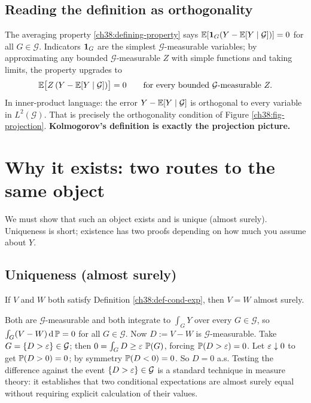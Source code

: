 \subsection{Reading the definition as orthogonality}
\label{ch38:read-as-orthogonality}

The averaging property \eqref{ch38:defining-property} says $\E[\ind_G (Y - \E[Y\given\mathcal{G}])] =
0$ for all $G \in \mathcal{G}$. Indicators $\ind_G$ are the simplest $\mathcal{G}$-measurable
variables; by approximating any bounded $\mathcal{G}$-measurable $Z$ with simple functions and taking
limits, the property upgrades to
\begin{equation}
\label{ch38:orthogonality}
  \E\!\big[Z\,(Y - \E[Y \given \mathcal{G}])\big] = 0 \qquad \text{for every bounded }
  \mathcal{G}\text{-measurable } Z.
\end{equation}
In inner-product language: the error $Y - \E[Y\given\mathcal{G}]$ is orthogonal to every variable in
$L^2(\mathcal{G})$. That is precisely the orthogonality condition of Figure
\ref{ch38:fig-projection}. \textbf{Kolmogorov's definition is exactly the projection picture.}

\section{Why it exists: two routes to the same object}
\label{ch38:existence}

We must show that such an object exists and is unique (almost surely). Uniqueness is short; existence has two proofs depending on how much you assume about $Y$.

\subsection{Uniqueness (almost surely)}
\label{ch38:uniqueness}

\begin{proposition}[Uniqueness]
\label{ch38:prop-uniqueness}
If $V$ and $W$ both satisfy Definition \ref{ch38:def-cond-exp}, then $V = W$ almost surely.
\end{proposition}

\begin{whybox}
Both are $\mathcal{G}$-measurable and both integrate to $\int_G Y$ over every $G \in \mathcal{G}$, so
$\int_G (V - W)\,\dd\P = 0$ for all $G \in \mathcal{G}$. Now $D := V - W$ is $\mathcal{G}$-measurable.
Take $G = \set{D > \eps} \in \mathcal{G}$; then $0 = \int_G D \ge \eps\,\P(G)$, forcing
$\P(D > \eps) = 0$. Let $\eps \downarrow 0$ to get $\P(D > 0) = 0$; by symmetry $\P(D < 0) = 0$. So
$D = 0$ a.s. Testing the difference against the event $\set{D > \eps} \in \mathcal{G}$
is a standard technique in measure theory: it establishes that two conditional expectations
are almost surely equal without requiring explicit calculation of their values.
\end{whybox}

